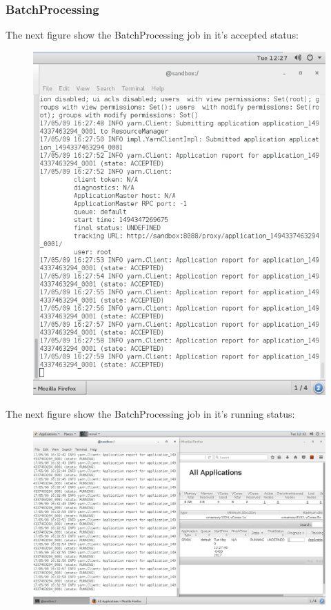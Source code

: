 \subsubsection{BatchProcessing}
\label{sec:sec01}
The next figure show the BatchProcessing job in it's accepted status:

\begin{figure}[h!]
	\centering
	\includegraphics[height=0.6\textheight]{fig01/SparkJobAccepted}
	\label{fig:FilialesEtClients}
\end{figure}
\newpage
The next figure show the BatchProcessing job in it's running status:
\begin{figure}[h!]
	\centering
	\includegraphics[height=0.3\textheight]{fig01/SparkJobRunning}
	\label{fig:FilialesEtClients}
\end{figure}
